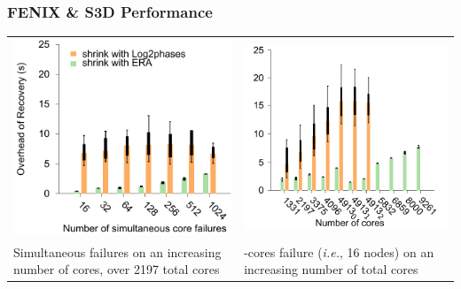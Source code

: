 \begin{frame}
  \frametitle{FENIX \& S3D Performance}
  \begin{tabular}{p{}p{}}
    \includegraphics[width=\linewidth]{s3d_scalability_1.pdf}
    &
    \includegraphics[width=\linewidth]{s3d_scalability_2_2.pdf}\\
    \centering Simultaneous failures on an increasing number of cores, over 2197
    total cores 
    &
     \centering 256-cores failure (\emph{i.e.}, 16 nodes) on an increasing number of
      total cores
  \end{tabular}
\end{frame}
